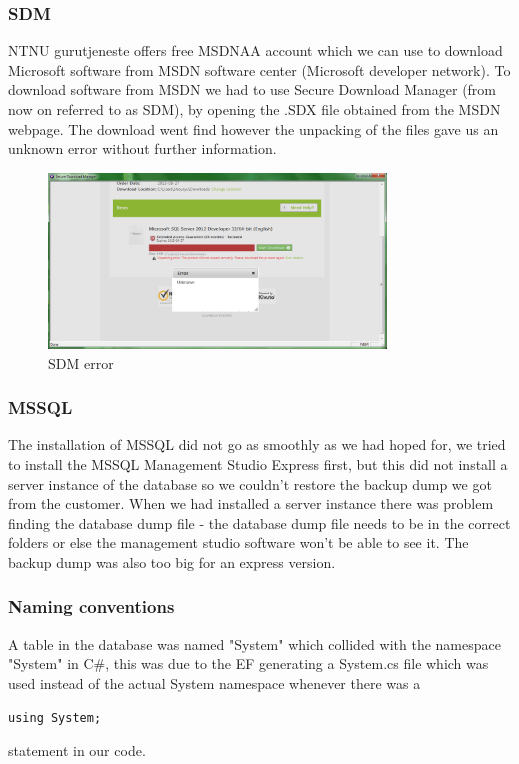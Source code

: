 \subsubsection{SDM}
NTNU gurutjeneste offers free MSDNAA account which we can use to download Microsoft software from MSDN software center (Microsoft developer network). To download software from MSDN we had to use Secure Download Manager (from now on referred to as SDM), by opening the .SDX file obtained from the MSDN webpage. The download went find however the unpacking of the files gave us an unknown error without further information.
\begin{figure}[H]
\centering
\includegraphics[width=0.8\textwidth]{images/issue00.png}
\caption{SDM error}
\label{fig:SDM_error}
\end{figure}

\subsubsection{MSSQL}
The installation of MSSQL did not go as smoothly as we had hoped for, we tried to install the MSSQL Management Studio Express first, but this did not install a server instance of the database so we couldn't restore the backup dump we got from the customer. When we had installed a server instance there was problem finding the database dump file - the database dump file needs to be in the correct folders or else the management studio software won't be able to see it. The backup dump was also too big for an express version.

\subsubsection{Naming conventions}
A table in the database was named "System" which collided with the namespace "System" in C\#, this was due to the EF generating a System.cs file which was used instead of the actual System namespace whenever there was a \begin{verbatim}using System;\end{verbatim}
statement in our code.



